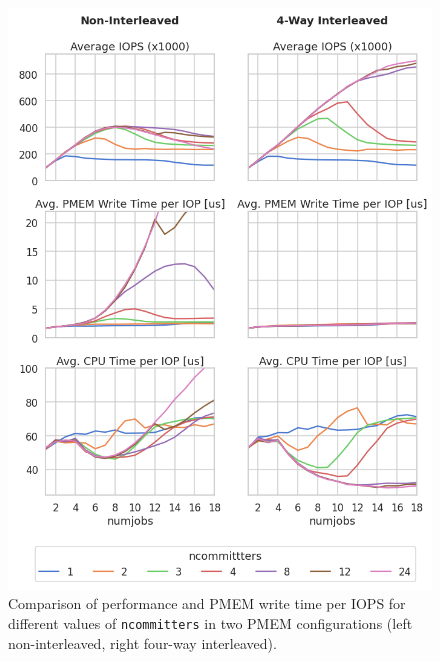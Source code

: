 \documentclass[12pt,a4paper,twoside]{book}
\begin{document}
\begin{figure}
    \centering
    \includegraphics[width=\textwidth]{fig/evaluation/ncommitters_scalability__comparison}
    \caption{Comparison of performance and PMEM write time per IOPS for different values of \lstinline{ncommitters} in two PMEM configurations (left non-interleaved, right four-way interleaved).}
    \label{fig:eval:ncommitters_scalability:main}
\end{figure}
\end{document}
